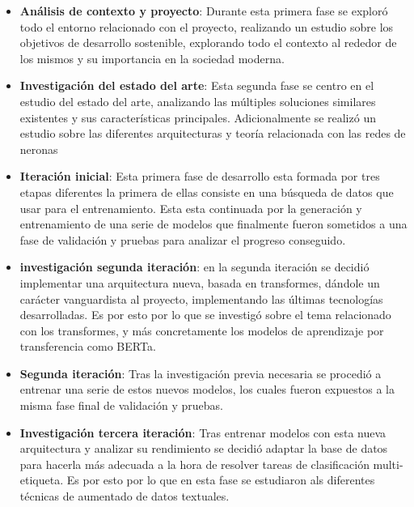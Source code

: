 \begin{itemize}
    \item \textbf{Análisis de contexto y proyecto}: Durante esta primera fase se
    exploró todo el entorno relacionado con el proyecto, realizando un estudio
    sobre los objetivos de desarrollo sostenible, explorando todo el contexto al
    rededor de los mismos y su importancia en la sociedad moderna.
  
    \item \textbf{Investigación del estado del arte}: Esta segunda fase se
    centro en el estudio del estado del arte, analizando las múltiples
    soluciones similares existentes y sus características principales.
    Adicionalmente se realizó un estudio sobre las diferentes arquitecturas y
    teoría relacionada con las redes de neronas 
    
    \item \textbf{Iteración inicial}: Esta primera fase de desarrollo esta
    formada por tres etapas diferentes la primera de ellas consiste en una
    búsqueda de datos que usar para el entrenamiento. Esta esta continuada por
    la generación y entrenamiento de una serie de modelos que finalmente fueron
    sometidos a una fase de validación y pruebas para analizar el progreso
    conseguido.
   
    \item \textbf{investigación segunda iteración}: en la segunda iteración se
    decidió implementar una arquitectura nueva, basada en transformes, dándole
    un carácter vanguardista al proyecto, implementando las últimas tecnologías
    desarrolladas. Es por esto por lo que se investigó sobre el tema relacionado
    con los transformes, y más concretamente los modelos de aprendizaje por transferencia
    como \gls{BERTa}.
   
    \item \textbf{Segunda iteración}: Tras la investigación previa necesaria se
    procedió a entrenar una serie de estos nuevos modelos, los cuales fueron
    expuestos a la misma fase final de validación y pruebas.
   
    \item \textbf{Investigación tercera iteración}: Tras entrenar modelos con
    esta nueva arquitectura y analizar su rendimiento se decidió adaptar la base
    de datos para hacerla más adecuada a la hora de resolver tareas de
    clasificación multi-etiqueta. Es por esto por lo que en esta fase se
    estudiaron als diferentes técnicas de aumentado de datos textuales.
 

\end{itemize}
